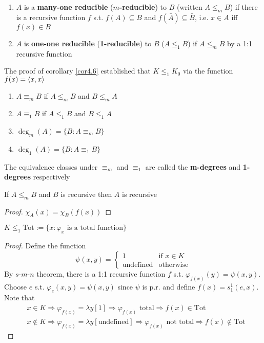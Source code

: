 \documentclass[11pt]{article}
\begin{document}
\begin{definition}[]
\begin{enumerate}
\item \(A\) is a \textbf{many-one reducible} (\textbf{\(m\)-reducible}) to \(B\) (written
\(A\le_m B\)) if there is a recursive function \(f\) s.t. \(f(A)\subseteq B\) and
\(f(\bar{A})\subseteq\bar{B}\), i.e. \(x\in A\) iff \(f(x)\in B\)
\item \(A\) is \textbf{one-one reducible} (\textbf{1-reducible}) to \(B\) (\(A\le_1 B\)) if
\(A\le_m B\) by a 1:1 recursive function
\end{enumerate}
\end{definition}

The proof of corollary \ref{cor4.6} established that \(K\le_1 K_0\) via the
function \(f(x)=\langle x,x\rangle\)
\begin{definition}[]
\begin{enumerate}
\item \(A\equiv_m B\) if \(A\le_m B\) and \(B\le_m A\)
\item \(A\equiv_1 B\) if \(A\le_1 B\) and \(B\le_1 A\)
\item \(\deg_m(A)=\{B:A\equiv_m B\}\)
\item \(\deg_1(A)=\{B:A\equiv_1 B\}\)
\end{enumerate}
\end{definition}

The equivalence classes under \(\equiv_m\) and \(\equiv_1\) are called the
\textbf{m-degrees} and \textbf{1-degrees} respectively

\begin{proposition}[]
If \(A\le_m B\) and \(B\) is recursive then \(A\) is recursive
\end{proposition}

\begin{proof}
\(\chi_A(x)=\chi_B(f(x))\)
\end{proof}

\begin{theorem}[]
\label{thm4.10}
\(K\le_1\text{Tot}:=\{x:\varphi_x\text{ is a total function}\}\)
\end{theorem}
\begin{proof}
Define the function
\begin{equation*}
\psi(x,y)=
\begin{cases}
1&\text{if } x\in K\\
\text{undefined} &\text{otherwise}
\end{cases}
\end{equation*}
By \(s\)-\(m\)-\(n\) theorem, there is a 1:1 recursive function \(f\) s.t.
\(\varphi_{f(x)}(y)=\psi(x,y)\). Choose \(e\) s.t. \(\varphi_e(x,y)=\psi(x,y)\) 
since \(\psi\) is p.r. and
define \(f(x)=s_1^1(e,x)\). Note that
\begin{align*}
&x\in K\Longrightarrow \varphi_{f(x)}=\lambda y[1]\Longrightarrow\varphi_{f(x)}\text{ total}
\Longrightarrow f(x)\in\text{Tot}\\
&x\not\in K\Longrightarrow\varphi_{f(x)}=\lambda y[\text{undefined}]\Longrightarrow
\varphi_{f(x)}\text{ not total}\Longrightarrow f(x)\not\in\text{Tot}
\end{align*}
\end{proof}
\end{document}
